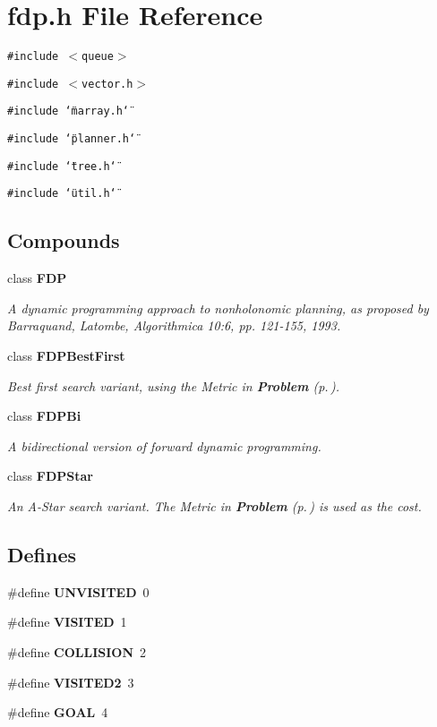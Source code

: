 \section{fdp.h File Reference}
\label{fdp_h}
{\tt \#include $<$queue$>$}\par
{\tt \#include $<$vector.h$>$}\par
{\tt \#include \char`\"{}marray.h\char`\"{}}\par
{\tt \#include \char`\"{}planner.h\char`\"{}}\par
{\tt \#include \char`\"{}tree.h\char`\"{}}\par
{\tt \#include \char`\"{}util.h\char`\"{}}\par
\subsection*{Compounds}
\begin{CompactItemize}
\item 
class {\bf FDP}
\begin{CompactList}\small\item\em A dynamic programming approach to nonholonomic planning, as proposed by Barraquand, Latombe, Algorithmica 10:6, pp. 121-155, 1993.\item\end{CompactList}\item 
class {\bf FDPBest\-First}
\begin{CompactList}\small\item\em Best first search variant, using the Metric in {\bf Problem} {\rm (p.\,\pageref{class_Problem})}.\item\end{CompactList}\item 
class {\bf FDPBi}
\begin{CompactList}\small\item\em A bidirectional version of forward dynamic programming.\item\end{CompactList}\item 
class {\bf FDPStar}
\begin{CompactList}\small\item\em An A-Star search variant. The Metric in {\bf Problem} {\rm (p.\,\pageref{class_Problem})} is used as the cost.\item\end{CompactList}\end{CompactItemize}
\subsection*{Defines}
\begin{CompactItemize}
\item 
\#define {\bf UNVISITED}\ 0
\item 
\#define {\bf VISITED}\ 1
\item 
\#define {\bf COLLISION}\ 2
\item 
\#define {\bf VISITED2}\ 3
\item 
\#define {\bf GOAL}\ 4
\end{CompactItemize}


